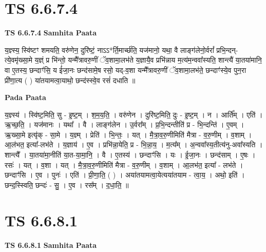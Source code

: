 \documentclass[17pt]{extarticle}
\begin{document}

\section{ TS 6.6.7.4 }

\textbf{TS 6.6.7.4 } \newline
\textbf{Samhita Paata} \newline

य॒ज्ञ्स्य॒ स्वि॑ष्टꣳ शमयति॒ वरु॑णेन॒ दुरि॑ष्टं॒ नाऽऽ*र्ति॒मार्च्छ॑ति॒ यज॑मानो॒ यथा॒ वै लाङ्ग॑लेनो॒र्वरां᳚ प्रभि॒न्दन्-त्ये॒वमृ॑ख्सा॒मे य॒ज्ञ्ं प्र भि॑न्तो॒ यन्मै᳚त्रावरु॒णीं ॅव॒शामा॒लभ॑ते य॒ज्ञायै॒व प्रभि॑न्नाय म॒त्य॑म॒न्ववा᳚स्यति॒ शान्त्यै॑ या॒तया॑मानि॒ वा ए॒तस्य॒ छन्दाꣳ॑सि॒ य ई॑जा॒नः छन्द॑सामे॒ष रसो॒ यद्-व॒शा यन्मै᳚त्रावरु॒णीं ॅव॒शामा॒लभ॑ते॒ छन्दाꣳ॑स्ये॒व पुन॒रा प्री॑णा॒त्य ( ) या॑तयामत्वा॒याथो॒ छन्द॑स्स्वे॒व रसं॑ दधाति ॥ \newline

\textbf{Pada Paata} \newline

य॒ज्ञ्स्य॑ । स्वि॑ष्ट॒मिति॒ सु - इ॒ष्ट॒म् । श॒म॒य॒ति॒ । वरु॑णेन । दुरि॑ष्ट॒मिति॒ दुः - इ॒ष्ट॒म् । न । आर्ति᳚म् । एति॑ । ऋ॒च्छ॒ति॒ । यज॑मानः । यथा᳚ । वै । लाङ्ग॑लेन । उ॒र्वरा᳚म् । प्र॒भि॒न्दन्तीति॑ प्र - भि॒न्दन्ति॑ । ए॒वम् । ऋ॒ख्सा॒मे इत्यृ॑क् - सा॒मे । य॒ज्ञ्म् । प्रेति॑ । भि॒न्तः॒ । यत् । मै॒त्रा॒व॒रु॒णीमिति॑ मैत्रा - व॒रु॒णीम् । व॒शाम् । आ॒ल॑भत॒ इत्या᳚-लभ॑ते । य॒ज्ञाय॑ । ए॒व । प्रभि॑न्ना॒येति॒ प्र - भि॒न्ना॒य॒ । म॒त्य᳚म् । अ॒न्ववा᳚स्य॒तीत्य॑नु-अवा᳚स्यति । शान्त्यै᳚ । या॒तया॑मा॒नीति॑ या॒त-या॒मा॒नि॒ । वै । ए॒तस्य॑ । छन्दाꣳ॑सि । यः । ई॒जा॒नः । छन्द॑साम् । ए॒षः । रसः॑ । यत् । व॒शा । यत् । मै॒त्रा॒व॒रु॒णीमिति॑ मैत्रा - व॒रु॒णीम् । व॒शाम् । आ॒लभ॑त॒ इत्या᳚ - लभ॑ते । छन्दाꣳ॑सि । ए॒व । पुनः॑ । एति॑ । प्री॒णा॒ति॒ ( ) । अया॑तयामत्वा॒येत्यया॑तयाम - त्वा॒य॒ । अथो॒ इति॑ । छन्द॒स्स्विति॒ छन्दः॑ - सु॒ । ए॒व । रस᳚म् । द॒धा॒ति॒ ॥  \newline





\section{ TS 6.6.8.1 }

\textbf{TS 6.6.8.1 } \newline
\textbf{Samhita Paata} \newline
\end{document}
